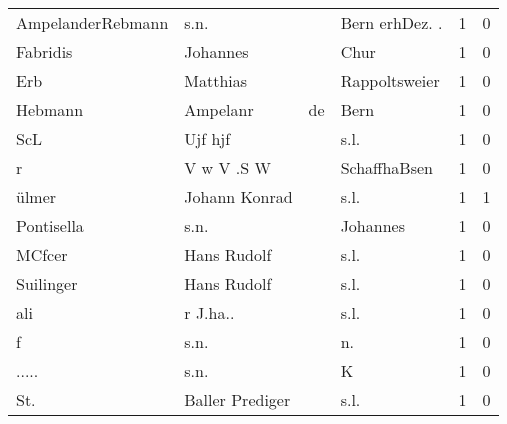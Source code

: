 \begin{center}
\begin{tiny}
\begin{longtabu}{llllrr}
        AmpelanderRebmann &                               s.n. &             &                             Bern erhDez. .  &          1 &         0 \\
                 Fabridis &                           Johannes &             &                                        Chur &          1 &         0 \\
                      Erb &                           Matthias &             &                               Rappoltsweier &          1 &         0 \\
                  Hebmann &                           Ampelanr &          de &                                        Bern &          1 &         0 \\
                      ScL &                            Ujf hjf &             &                                        s.l. &          1 &         0 \\
                        r &                         V w V .S W &             &                                SchaffhaBsen &          1 &         0 \\
                    ülmer &                      Johann Konrad &             &                                        s.l. &          1 &         1 \\
               Pontisella &                               s.n. &             &                                    Johannes &          1 &         0 \\
                   MCfcer &                        Hans Rudolf &             &                                        s.l. &          1 &         0 \\
                Suilinger &                        Hans Rudolf &             &                                        s.l. &          1 &         0 \\
                      ali &                           r J.ha.. &             &                                        s.l. &          1 &         0 \\
                        f &                               s.n. &             &                                         n.  &          1 &         0 \\
                    ..... &                               s.n. &             &                                           K &          1 &         0 \\
                      St. &                    Baller Prediger &             &                                        s.l. &          1 &         0 \\

\end{longtabu}
\end{tiny}
\end{center}
